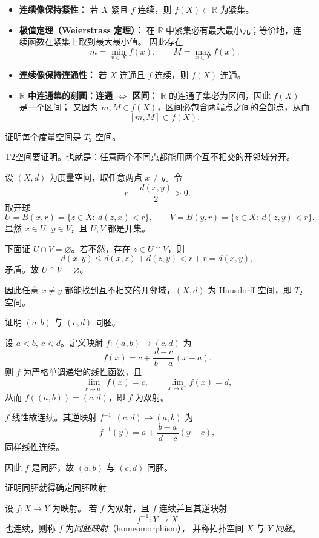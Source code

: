 \begin{dxtips}
    \begin{itemize}
  \item \textbf{连续像保持紧性：}
  若 $X$ 紧且 $f$ 连续，则 $f(X)\subset\mathbb R$ 为紧集。

  \item \textbf{极值定理（Weierstrass 定理）：}
  在 $\mathbb R$ 中紧集必有最大最小元；等价地，连续函数在紧集上取到最大最小值。
  因此存在
  \[
  m=\min_{x\in X} f(x),\qquad M=\max_{x\in X} f(x).
  \]

  \item \textbf{连续像保持连通性：}
  若 $X$ 连通且 $f$ 连续，则 $f(X)$ 连通。

  \item \textbf{$\mathbb R$ 中连通集的刻画：连通 $\Longleftrightarrow$ 区间：}
  $\mathbb R$ 的连通子集必为区间，因此 $f(X)$ 是一个区间；
  又因为 $m,M\in f(X)$，区间必包含两端点之间的全部点，从而
  \[
  [m,M]\subset f(X).
  \]
\end{itemize}
\end{dxtips}
\begin{homework}[8]
证明每个度量空间是 \(T_{2}\) 空间。
\end{homework}
\begin{dxtips}
    T2空间要证明。也就是：任意两个不同点都能用两个互不相交的开邻域分开。
\end{dxtips}
\begin{solution}
设 $(X,d)$ 为度量空间，取任意两点 $x\neq y$。令
\[
r=\frac{d(x,y)}{2}>0.
\]
取开球
\[
U=B(x,r)=\{z\in X:\ d(z,x)<r\},\qquad V=B(y,r)=\{z\in X:\ d(z,y)<r\}.
\]
显然 $x\in U,\ y\in V$，且 $U,V$ 都是开集。

下面证 $U\cap V=\varnothing$。若不然，存在 $z\in U\cap V$，则
\[
d(x,y)\le d(x,z)+d(z,y)<r+r=d(x,y),
\]
矛盾。故 $U\cap V=\varnothing$。

因此任意 $x\neq y$ 都能找到互不相交的开邻域，$(X,d)$ 为 Hausdorff 空间，即 $T_2$ 空间。
\end{solution}
\begin{homework}[9]
证明 \((a,b)\) 与 \((c,d)\) 同胚。
\end{homework}
\begin{solution}
设 $a<b,\ c<d$。定义映射 $f:(a,b)\to(c,d)$ 为
\[
f(x)=c+\frac{d-c}{\,b-a\,}(x-a).
\]
则 $f$ 为严格单调递增的线性函数，且
\[
\lim_{x\to a^+} f(x)=c,\qquad \lim_{x\to b^-} f(x)=d,
\]
从而 $f((a,b))=(c,d)$，即 $f$ 为双射。

$f$ 线性故连续。其逆映射 $f^{-1}:(c,d)\to(a,b)$ 为
\[
f^{-1}(y)=a+\frac{b-a}{\,d-c\,}(y-c),
\]
同样线性连续。

因此 $f$ 是同胚，故 $(a,b)$ 与 $(c,d)$ 同胚。
\end{solution}
\begin{dxtips}
    证明同胚就得确定同胚映射
  
\end{dxtips}
  \begin{definition}
设 $f:X\to Y$ 为映射。
若 $f$ 为双射，且 $f$ 连续并且其逆映射
\[
f^{-1}:Y\to X
\]
也连续，则称 $f$ 为\emph{同胚映射}（homeomorphism），
并称拓扑空间 $X$ 与 $Y$ \emph{同胚}。
\end{definition}